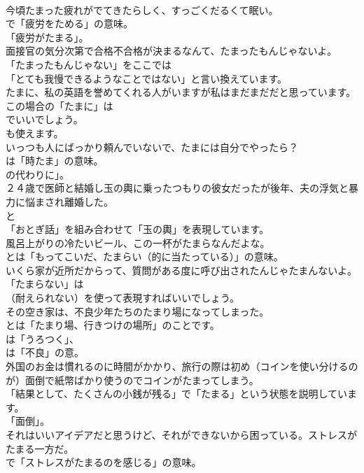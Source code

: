 \documentclass[8pt]{extreport}
\begin{document}
\begin{CJK}{UTF8}{min}
\\	今頃たまった疲れがでてきたらしく、すっごくだるくて眠い。 
\\	で「疲労をためる」の意味。
\\	「疲労がたまる」。	
\\	面接官の気分次第で合格不合格が決まるなんて、たまったもんじゃないよ。 
\\	「たまったもんじゃない」をここでは
\\	「とても我慢できるようなことではない」と言い換えています。	
\\	たまに、私の英語を誉めてくれる人がいますが私はまだまだだと思っています。 
\\	この場合の「たまに」は 
\\	でいいでしょう。
\\	も使えます。	
\\	いっつも人にばっかり頼んでいないで、たまには自分でやったら？ 
\\	は「時たま」の意味。
\\	の代わりに」。	
\\	２４歳で医師と結婚し玉の輿に乗ったつもりの彼女だったが後年、夫の浮気と暴力に悩まされ離婚した。 
\\	と
\\	「おとぎ話」を組み合わせて「玉の輿」を表現しています。	
\\	風呂上がりの冷たいビール、この一杯がたまらなんだよな。 
\\	とは「もってこいだ、たまらい（的に当たっている）」の意味。	
\\	いくら家が近所だからって、質問がある度に呼び出されたんじゃたまんないよ。 
\\	「たまらない」は 
\\	（耐えられない）を使って表現すればいいでしょう。	
\\	その空き家は、不良少年たちのたまり場になってしまった。 
\\	とは「たまり場、行きつけの場所」のことです。
\\	は「うろつく」、
\\	は「不良」の意。	
\\	外国のお金は慣れるのに時間がかかり、旅行の際は初め（コインを使い分けるのが）面倒で紙幣ばかり使うのでコインがたまってしまう。 
\\	「結果として、たくさんの小銭が残る」で「たまる」という状態を説明しています。
\\	「面倒」。	
\\	それはいいアイデアだと思うけど、それができないから困っている。ストレスがたまる一方だ。 
\\	で「ストレスがたまるのを感じる」の意味。

\end{CJK}
\end{document}
